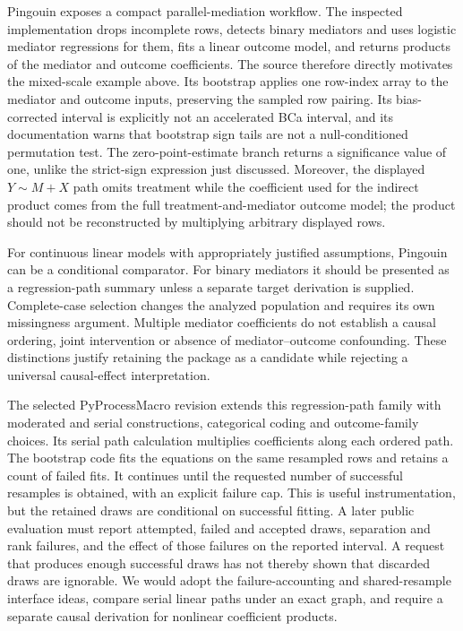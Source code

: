 Pingouin exposes a compact parallel-mediation workflow. The inspected implementation drops incomplete rows, detects binary mediators and uses logistic mediator regressions for them, fits a linear outcome model, and returns products of the mediator and outcome coefficients. The source therefore directly motivates the mixed-scale example above. Its bootstrap applies one row-index array to the mediator and outcome inputs, preserving the sampled row pairing. Its bias-corrected interval is explicitly not an accelerated BCa interval, and its documentation warns that bootstrap sign tails are not a null-conditioned permutation test. The zero-point-estimate branch returns a significance value of one, unlike the strict-sign expression just discussed. Moreover, the displayed $Y\sim M+X$ path omits treatment while the coefficient used for the indirect product comes from the full treatment-and-mediator outcome model; the product should not be reconstructed by multiplying arbitrary displayed rows. \cite{exec25_pymed_pingouin}

For continuous linear models with appropriately justified assumptions, Pingouin can be a conditional comparator. For binary mediators it should be presented as a regression-path summary unless a separate target derivation is supplied. Complete-case selection changes the analyzed population and requires its own missingness argument. Multiple mediator coefficients do not establish a causal ordering, joint intervention or absence of mediator--outcome confounding. These distinctions justify retaining the package as a candidate while rejecting a universal causal-effect interpretation. \cite{exec25_pymed_pingouin,exec25_pymed_choice}

The selected PyProcessMacro revision extends this regression-path family with moderated and serial constructions, categorical coding and outcome-family choices. Its serial path calculation multiplies coefficients along each ordered path. The bootstrap code fits the equations on the same resampled rows and retains a count of failed fits. It continues until the requested number of successful resamples is obtained, with an explicit failure cap. This is useful instrumentation, but the retained draws are conditional on successful fitting. A later public evaluation must report attempted, failed and accepted draws, separation and rank failures, and the effect of those failures on the reported interval. A request that produces enough successful draws has not thereby shown that discarded draws are ignorable. We would adopt the failure-accounting and shared-resample interface ideas, compare serial linear paths under an exact graph, and require a separate causal derivation for nonlinear coefficient products. \cite{exec25_pymed_process,exec25_pymed_choice}

